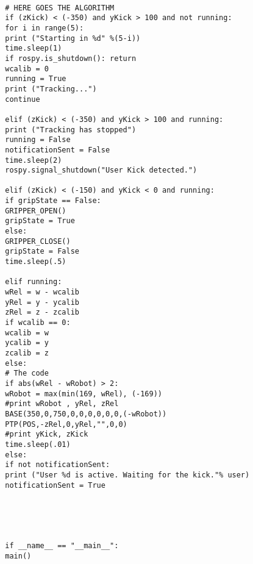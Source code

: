 \documentclass{book}
\begin{document}
\begin{verbatim}
		
		# HERE GOES THE ALGORITHM
		if (zKick) < (-350) and yKick > 100 and not running:
		for i in range(5):
		print ("Starting in %d" %(5-i))
		time.sleep(1)
		if rospy.is_shutdown(): return
		wcalib = 0
		running = True	
		print ("Tracking...")
		continue
		
		elif (zKick) < (-350) and yKick > 100 and running:
		print ("Tracking has stopped")
		running = False
		notificationSent = False
		time.sleep(2)
		rospy.signal_shutdown("User Kick detected.")
		
		elif (zKick) < (-150) and yKick < 0 and running:
		if gripState == False: 
		GRIPPER_OPEN()
		gripState = True
		else: 
		GRIPPER_CLOSE()
		gripState = False
		time.sleep(.5)	
		
		elif running:
		wRel = w - wcalib
		yRel = y - ycalib
		zRel = z - zcalib
		if wcalib == 0: 
		wcalib = w
		ycalib = y
		zcalib = z
		else: 
		# The code 
		if abs(wRel - wRobot) > 2:
		wRobot = max(min(169, wRel), (-169))
		#print wRobot , yRel, zRel
		BASE(350,0,750,0,0,0,0,0,0,(-wRobot))	
		PTP(POS,-zRel,0,yRel,"",0,0)
		#print yKick, zKick	
		time.sleep(.01)
		else:
		if not notificationSent:
		print ("User %d is active. Waiting for the kick."% user)	
		notificationSent = True
		
		
		
		
		
		if __name__ == "__main__":
		main()
	\end{verbatim}

	\newpage
\end{document}
